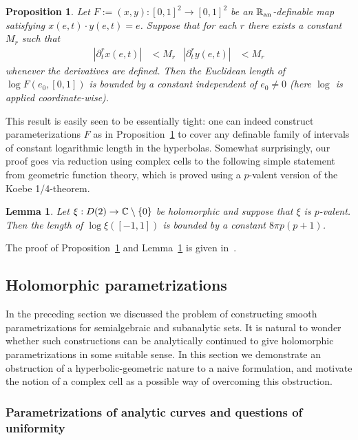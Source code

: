 \documentclass[reqno]{amsart}
\newtheorem{Prop}[Cor]{Proposition}{\bfseries}{\itshape}
\newtheorem{Lem}[Cor]{Lemma}{\bfseries}{\itshape}
\renewcommand\~[1]{\widetilde{#1}}
\def\an{{\text{an}}}
\begin{document}
\begin{Prop}\label{prop:hyp-param}
  Let $F:=(x,y):[0,1]^2\to[0,1]^2$ be an $\R_\an$-definable map
  satisfying $x(e,t)\cdot y(e,t)=e$. Suppose that for each $r$ there
  exists a constant $M_r$ such that
  \begin{align}\label{eq:derivatives bounded}
    \left|\partial_t^r x(e,t)\right|&<M_r & \left|\partial_t^r y(e,t)\right|&<M_r
  \end{align}
  whenever the derivatives are defined. Then the Euclidean length of
  $\log F(e_0,[0,1])$ is bounded by a constant independent of
  $e_0\neq0$ (here $\log$ is applied coordinate-wise).
\end{Prop}

This result is easily seen to be essentially tight: one can indeed
construct parameterizations $F$ as in Proposition~\ref{prop:hyp-param}
to cover any definable family of intervals of constant logarithmic
length in the hyperbolas. Somewhat surprisingly, our proof goes via
reduction using complex cells to the following simple statement from
geometric function theory, which is proved using a $p$-valent version
of the Koebe 1/4-theorem.

\begin{Lem}\label{lem:log-length}
  Let $\xi:D(2)\to{\mathbb C}\setminus\{0\}$ be holomorphic and suppose that
  $\xi$ is $p$-valent. Then the length of $\log\xi([-1,1])$ is bounded
  by a constant $8\pi p(p+1)$.
\end{Lem}

The proof of Proposition~\ref{prop:hyp-param} and
Lemma~\ref{lem:log-length} is given
in~.

\subsection{Holomorphic parametrizations}

In the preceding section we discussed the problem of constructing
smooth parametrizations for semialgebraic and subanalytic sets. It is
natural to wonder whether such constructions can be analytically
continued to give holomorphic parametrizations in some suitable
sense. In this section we demonstrate an obstruction of a
hyperbolic-geometric nature to a naive formulation, and motivate the
notion of a complex cell as a possible way of overcoming this
obstruction.

\subsubsection{Parametrizations of analytic curves and questions of
  uniformity}
\label{sec:parametrization-uniformity}
\end{document}
